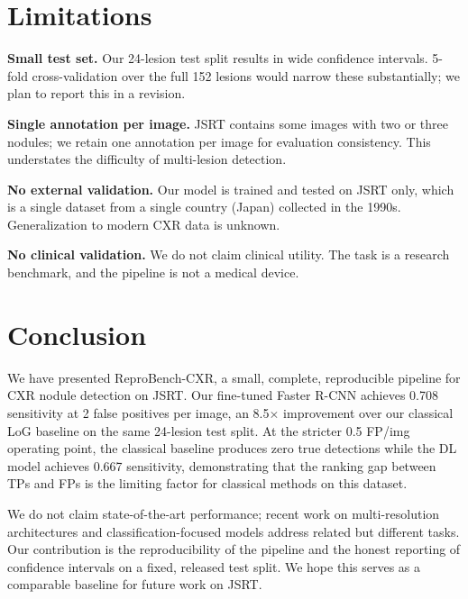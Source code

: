 \documentclass[11pt]{article}
\begin{document}
\section{Limitations}
\label{sec:limitations}

\textbf{Small test set.} Our 24-lesion test split results in wide confidence
intervals. 5-fold cross-validation over the full 152 lesions would narrow
these substantially; we plan to report this in a revision.

\textbf{Single annotation per image.} JSRT contains some images with two or
three nodules; we retain one annotation per image for evaluation consistency.
This understates the difficulty of multi-lesion detection.

\textbf{No external validation.} Our model is trained and tested on JSRT
only, which is a single dataset from a single country (Japan) collected
in the 1990s. Generalization to modern CXR data is unknown.

\textbf{No clinical validation.} We do not claim clinical utility. The
task is a research benchmark, and the pipeline is not a medical device.

\section{Conclusion}

We have presented ReproBench-CXR, a small, complete, reproducible pipeline
for CXR nodule detection on JSRT. Our fine-tuned Faster R-CNN achieves
0.708 sensitivity at 2 false positives per image, an 8.5$\times$ improvement
over our classical LoG baseline on the same 24-lesion test split. At the
stricter 0.5 FP/img operating point, the classical baseline produces zero
true detections while the DL model achieves 0.667 sensitivity, demonstrating
that the ranking gap between TPs and FPs is the limiting factor for
classical methods on this dataset.

We do not claim state-of-the-art performance; recent work on multi-resolution
architectures \cite{li2020multi} and classification-focused models
\cite{habeeb2025modified} address related but different tasks. Our
contribution is the reproducibility of the pipeline and the honest
reporting of confidence intervals on a fixed, released test split. We hope
this serves as a comparable baseline for future work on JSRT.
\end{document}
